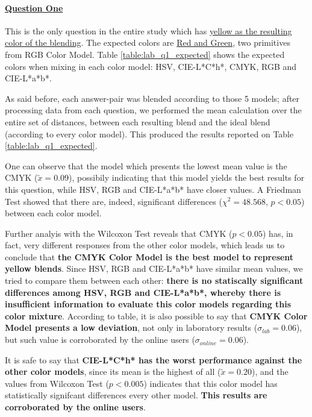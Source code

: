 \paragraph{\ul{Question One}}
%
This is the only question in the entire study which has \ul{yellow as the resulting color of the blending}. The expected colors are \ul{Red and Green}, two primitives from RGB Color Model. Table \ref{table:lab_q1_expected} shows the
expected colors when mixing in each color model: HSV, CIE-L*C*h*, CMYK, RGB and CIE-L*a*b*. \par
%
As said before, each answer-pair was blended according to those 5 models; after processing data from each question, we performed the mean calculation over the entire set of distances, between each resulting blend and the ideal blend (according
to every color model). This produced the results reported on Table \ref{table:lab_q1_expected}. \par
%
One can observe that the model which presents the lowest mean value is the CMYK ($\tilde{x} = 0.09$), possibily indicating that this model yields the best results for this question, while HSV, RGB and CIE-L*a*b* have closer values.
A Friedman Test showed that there are, indeed, significant differences ($\chi^2 = 48.568$, $p < 0.05$) between each color model. \par
%
Further analyis with the Wilcoxon Test reveals that CMYK ($p < 0.05$) has, in fact, very different responses from the other color models, which leads us to conclude that \textbf{the CMYK Color Model is the best model to represent yellow blends}.
Since HSV, RGB and CIE-L*a*b* have similar mean values, we tried to compare them between each other: \textbf{there is no statiscally significant differences among HSV, RGB and CIE-L*a*b*, whereby there is insufficient information to evaluate this
color models regarding this color mixture}. According to table, it is also possible to say that \textbf{CMYK Color Model presents a low deviation}, not only in laboratory results ($\sigma_{lab} = 0.06$), but
such value is corroborated by the online users ($\sigma_{online} = 0.06$). \par
%
It is safe to say that \textbf{CIE-L*C*h* has the worst performance against the other color models}, since its mean is the highest of all ($\tilde{x} = 0.20$), and the values from Wilcoxon Test ($p < 0.005$) indicates that this color model has
statistically signifcant differences every other model. \textbf{This results are corroborated by the online users}. \par
%
